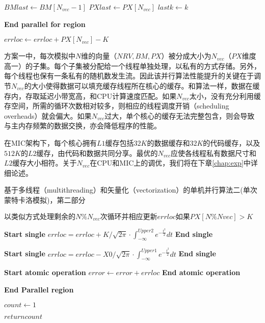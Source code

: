 \begin{algorithm}
\begin{algorithmic}[1]
    \State $BMlast \gets BM[N_{vec}-1]$
    \State $PXlast \gets PX[N_{vec}]$
    \State $lastk \gets k$

    \EndFor
    \State \textbf{End parallel for region}

    \State $errloc \gets errloc + PX[N_{vec}] - K$ 
    \EndIf
    \EndIf

    \end{algorithmic}
  \end{algorithm}

方案一中，每次模拟中$N$维的向量（$NRV, BM, PX$）被分成大小为$N_{vec}$（$PX$维度高一）的子集。每个子集被分配给一个线程单独处理，以私有的方式存储。另外，每个线程也保有一条私有的随机数发生流。因此该并行算法性能提升的关键在于调节$N_{vec}$的大小使得数据可以填充缓存线程所在核心的缓存。和算法\label{alg:omp1}一样，数据在缓存内，存取延迟小带宽高，和CPU计算速度匹配。如果$N_{vec}$太小，没有充分利用缓存空间，所需的循环次数相对较多，则相应的线程调度开销（scheduling overheads）就会偏大。如果$N_{vec}$过大，单个核心的缓存无法完整包含，则会导致与主内存频繁的数据交换，亦会降低程序的性能。

在MIC架构下，每个核心拥有$L1$缓存包括$32K$的数据缓存和$32K$的代码缓存，以及$512K$的$L2$缓存，由代码和数据共同分享。最优的$N_{vec}$应使各线程私有数据尺寸和$L2$缓存大小相符。关于$N_{vec}$在CPU和MIC上的调优，我们将在下章\ref{chap:exp}中详细论述。


\begin{algorithm}
  \caption{基于多线程（multithreading）和矢量化（vectorization）的单机并行算法二(单次蒙特卡洛模拟)，第二部分}
  \label{alg:omp2_2}
  \begin{algorithmic}[1]

    \State $以类似方式处理剩余的N\%N_{vec}次循环并相应更新errloc如果PX[N\%Nvec]>K$
    
    \State \textbf{Start single} 
    \State $errloc = errloc + K/\sqrt{2\pi} \cdot \int_{-\infty}^{Upper2}e^{-\frac{t^2}{2}}dt$
    \State \textbf{End single}

    \State \textbf{Start single} 
    \State $errloc = errloc - X0/\sqrt{2\pi}\cdot \int_{-\infty}^{Upper1}e^{-\frac{t^2}{2}}dt$
    \State \textbf{End single}

    
    \State \textbf{Start atomic operation} 
    \State $error \gets error + errloc$
    \State \textbf{End atomic operation}

    \State \textbf{End Parallel region}    

    \State $count \gets 1$
    \EndIf
    
    \State $return count$

    \EndProcedure
  \end{algorithmic}
\end{algorithm}

